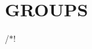 \chapter{GROUPS }
\hypertarget{md_docs_2_g_r_o_u_p_s}{}\label{md_docs_2_g_r_o_u_p_s}
/\+\texorpdfstring{$\ast$}{*}! 